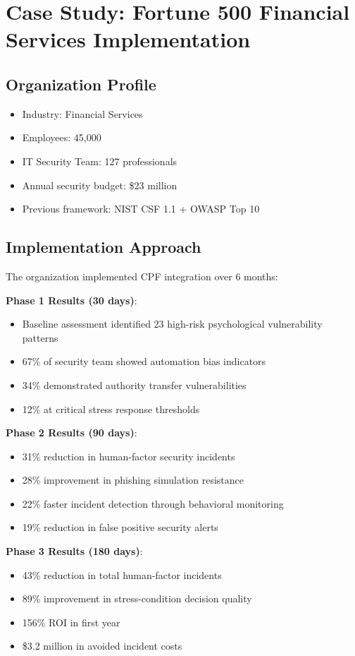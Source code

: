 \documentclass[11pt,a4paper]{article}
\begin{document}
\section{Case Study: Fortune 500 Financial Services Implementation}

\subsection{Organization Profile}
\begin{itemize}
\item Industry: Financial Services
\item Employees: 45,000
\item IT Security Team: 127 professionals
\item Annual security budget: \$23 million
\item Previous framework: NIST CSF 1.1 + OWASP Top 10
\end{itemize}

\subsection{Implementation Approach}

The organization implemented CPF integration over 6 months:

\textbf{Phase 1 Results (30 days)}:
\begin{itemize}
\item Baseline assessment identified 23 high-risk psychological vulnerability patterns
\item 67\% of security team showed automation bias indicators
\item 34\% demonstrated authority transfer vulnerabilities
\item 12\% at critical stress response thresholds
\end{itemize}

\textbf{Phase 2 Results (90 days)}:
\begin{itemize}
\item 31\% reduction in human-factor security incidents
\item 28\% improvement in phishing simulation resistance
\item 22\% faster incident detection through behavioral monitoring
\item 19\% reduction in false positive security alerts
\end{itemize}

\textbf{Phase 3 Results (180 days)}:
\begin{itemize}
\item 43\% reduction in total human-factor incidents
\item 89\% improvement in stress-condition decision quality
\item 156\% ROI in first year
\item \$3.2 million in avoided incident costs
\end{itemize}
\end{document}
